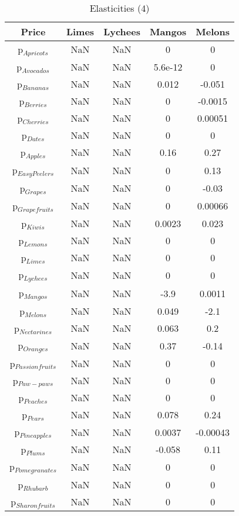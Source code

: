 \documentclass[11pt]{article}
\begin{document}
\begin{table}[h]
\caption{Elasticities (4)}
\label{Table: elasticities 4}
\begin{center}
\begin{tabular}{ccccc}
Price & Limes & Lychees & Mangos & Melons \\ \hline
p$_{Apricots}$ & NaN & NaN & 0 & 0 \\ 
p$_{Avocados}$ & NaN & NaN & 5.6e-12 & 0 \\ 
p$_{Bananas}$ & NaN & NaN & 0.012 & -0.051 \\ 
p$_{Berries}$ & NaN & NaN & 0 & -0.0015 \\ 
p$_{Cherries}$ & NaN & NaN & 0 & 0.00051 \\ 
p$_{Dates}$ & NaN & NaN & 0 & 0 \\ 
p$_{Apples}$ & NaN & NaN & 0.16 & 0.27 \\ 
p$_{Easy Peelers}$ & NaN & NaN & 0 & 0.13 \\ 
p$_{Grapes}$ & NaN & NaN & 0 & -0.03 \\ 
p$_{Grapefruits}$ & NaN & NaN & 0 & 0.00066 \\ 
p$_{Kiwis}$ & NaN & NaN & 0.0023 & 0.023 \\ 
p$_{Lemons}$ & NaN & NaN & 0 & 0 \\ 
p$_{Limes}$ & NaN & NaN & 0 & 0 \\ 
p$_{Lychees}$ & NaN & NaN & 0 & 0 \\ 
p$_{Mangos}$ & NaN & NaN & -3.9 & 0.0011 \\ 
p$_{Melons}$ & NaN & NaN & 0.049 & -2.1 \\ 
p$_{Nectarines}$ & NaN & NaN & 0.063 & 0.2 \\ 
p$_{Oranges}$ & NaN & NaN & 0.37 & -0.14 \\ 
p$_{Passion fruits}$ & NaN & NaN & 0 & 0 \\ 
p$_{Paw-paws}$ & NaN & NaN & 0 & 0 \\ 
p$_{Peaches}$ & NaN & NaN & 0 & 0 \\ 
p$_{Pears}$ & NaN & NaN & 0.078 & 0.24 \\ 
p$_{Pineapples}$ & NaN & NaN & 0.0037 & -0.00043 \\ 
p$_{Plums}$ & NaN & NaN & -0.058 & 0.11 \\ 
p$_{Pomegranates}$ & NaN & NaN & 0 & 0 \\ 
p$_{Rhubarb}$ & NaN & NaN & 0 & 0 \\ 
p$_{Sharon fruits}$ & NaN & NaN & 0 & 0 \\ 
\end{tabular}
\end{center}
\end{table}
\end{document}
